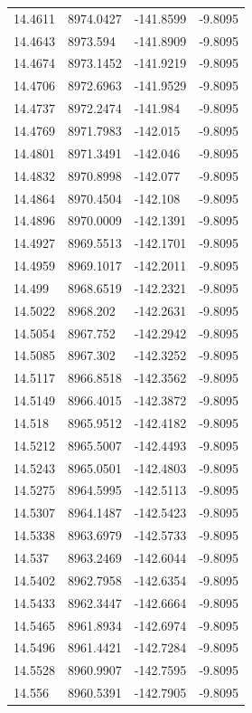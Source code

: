 \begin{table}[H]
\begin{tabular}{llll}
14.4611 & 8974.0427 & -141.8599 & -9.8095 \\
14.4643 & 8973.594 & -141.8909 & -9.8095 \\
14.4674 & 8973.1452 & -141.9219 & -9.8095 \\
14.4706 & 8972.6963 & -141.9529 & -9.8095 \\
14.4737 & 8972.2474 & -141.984 & -9.8095 \\
14.4769 & 8971.7983 & -142.015 & -9.8095 \\
14.4801 & 8971.3491 & -142.046 & -9.8095 \\
14.4832 & 8970.8998 & -142.077 & -9.8095 \\
14.4864 & 8970.4504 & -142.108 & -9.8095 \\
14.4896 & 8970.0009 & -142.1391 & -9.8095 \\
14.4927 & 8969.5513 & -142.1701 & -9.8095 \\
14.4959 & 8969.1017 & -142.2011 & -9.8095 \\
14.499 & 8968.6519 & -142.2321 & -9.8095 \\
14.5022 & 8968.202 & -142.2631 & -9.8095 \\
14.5054 & 8967.752 & -142.2942 & -9.8095 \\
14.5085 & 8967.302 & -142.3252 & -9.8095 \\
14.5117 & 8966.8518 & -142.3562 & -9.8095 \\
14.5149 & 8966.4015 & -142.3872 & -9.8095 \\
14.518 & 8965.9512 & -142.4182 & -9.8095 \\
14.5212 & 8965.5007 & -142.4493 & -9.8095 \\
14.5243 & 8965.0501 & -142.4803 & -9.8095 \\
14.5275 & 8964.5995 & -142.5113 & -9.8095 \\
14.5307 & 8964.1487 & -142.5423 & -9.8095 \\
14.5338 & 8963.6979 & -142.5733 & -9.8095 \\
14.537 & 8963.2469 & -142.6044 & -9.8095 \\
14.5402 & 8962.7958 & -142.6354 & -9.8095 \\
14.5433 & 8962.3447 & -142.6664 & -9.8095 \\
14.5465 & 8961.8934 & -142.6974 & -9.8095 \\
14.5496 & 8961.4421 & -142.7284 & -9.8095 \\
14.5528 & 8960.9907 & -142.7595 & -9.8095 \\
14.556 & 8960.5391 & -142.7905 & -9.8095 \\

\end{tabular}
\end{table}
